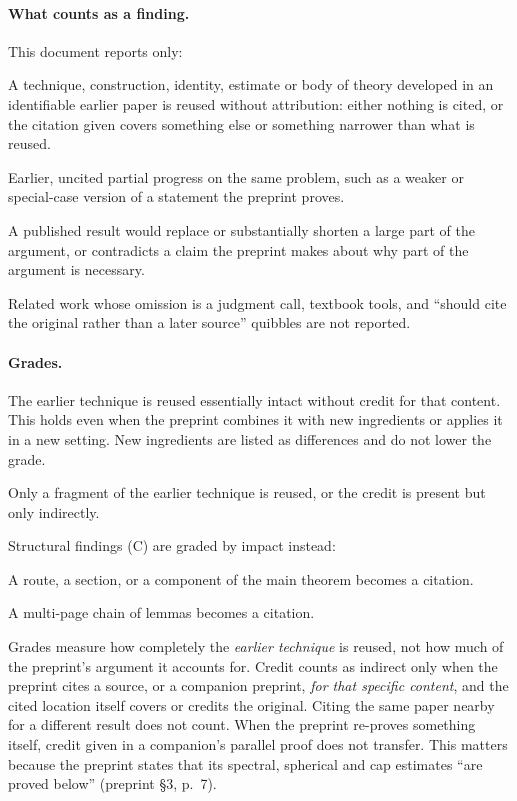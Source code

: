 \documentclass[11pt]{article}
\newcommand{\grade}[1]{\textsc{#1}}
\begin{document}
\paragraph{What counts as a finding.}
This document reports only:
\begin{description}[leftmargin=1.5em,font=\normalfont\bfseries]
\item[(A) Unattributed reuse.] A technique, construction, identity, estimate or
body of theory developed in an identifiable earlier paper is reused without
attribution: either nothing is cited, or the citation given covers something
else or something narrower than what is reused.
\item[(B) Same-problem precedence.] Earlier, uncited partial progress on the
same problem, such as a weaker or special-case version of a statement the
preprint proves.
\item[(C) Structural.] A published result would replace or substantially
shorten a large part of the argument, or contradicts a claim the preprint
makes about why part of the argument is necessary.
\end{description}
Related work whose omission is a judgment call, textbook tools, and ``should
cite the original rather than a later source'' quibbles are not reported.

\paragraph{Grades.}
\begin{description}[leftmargin=1.5em,font=\normalfont\bfseries]
\item[\grade{Strong}.] The earlier technique is reused essentially intact
without credit for that content. This holds even when the preprint combines it
with new ingredients or applies it in a new setting. New ingredients are
listed as differences and do not lower the grade.
\item[\grade{Partial}.] Only a fragment of the earlier technique is reused, or
the credit is present but only indirectly.
\end{description}
Structural findings (C) are graded by impact instead:
\begin{description}[leftmargin=1.5em,font=\normalfont\bfseries]
\item[\grade{Major}.] A route, a section, or a component of the main theorem
becomes a citation.
\item[\grade{Moderate}.] A multi-page chain of lemmas becomes a citation.
\end{description}
Grades measure how completely the \emph{earlier technique} is reused, not how
much of the preprint's argument it accounts for. Credit counts as indirect
only when the preprint cites a source, or a companion preprint, \emph{for that
specific content}, and the cited location itself covers or credits the
original. Citing the same paper nearby for a different result does not count.
When the preprint re-proves something itself, credit given in a companion's
parallel proof does not transfer. This matters because the preprint states
that its spectral, spherical and cap estimates ``are proved below''
(preprint \S3, p.~7).
\end{document}
